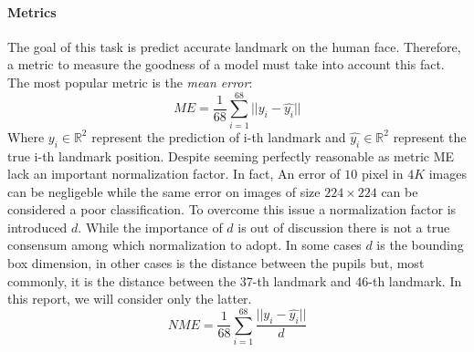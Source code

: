 \paragraph{Metrics}
The goal of this task is predict accurate landmark on the human face. Therefore, a metric to measure the goodness of a model must take into account this fact. The most popular metric is the \textit{mean error}:
\[ME = \frac{1}{68}\sum_{i=1}^{68}||y_i-\hat{y_i}||\]
Where $y_i \in \mathbb{R}^2$ represent the prediction of i-th landmark and $\hat{y_i} \in \mathbb{R}^2$ represent the true i-th landmark position. Despite seeming perfectly reasonable as metric ME lack an important normalization factor. In fact, An error of $10$ pixel in $4K$ images can be negligeble while the same error on images of size $224\times 224$ can be considered a poor classification. To overcome this issue a normalization factor is introduced $d$. While the importance of $d$ is out of discussion there is not a true consensum among which normalization to adopt. In some cases $d$ is the bounding box dimension, in other cases is the distance between the pupils but, most commonly, it is the distance between the 37-th landmark and 46-th landmark. In this report, we will consider only the latter.
\[NME = \frac{1}{68}\sum_{i=1}^{68}\frac{||y_i-\hat{y_i}||}{d}\]

